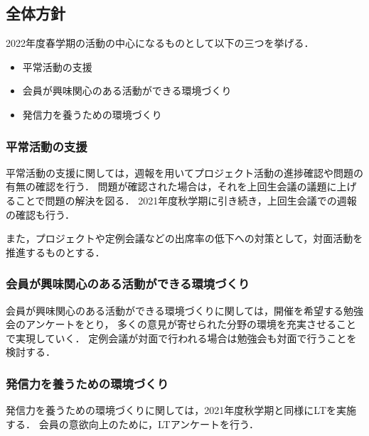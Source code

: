 \subsection*{全体方針}


2022年度春学期の活動の中心になるものとして以下の三つを挙げる．
\begin{itemize}
  \item 平常活動の支援
  \item 会員が興味関心のある活動ができる環境づくり
  \item 発信力を養うための環境づくり
\end{itemize}

\subsubsection*{平常活動の支援}
平常活動の支援に関しては，週報を用いてプロジェクト活動の進捗確認や問題の有無の確認を行う．
問題が確認された場合は，それを上回生会議の議題に上げることで問題の解決を図る．
2021年度秋学期に引き続き，上回生会議での週報の確認も行う．

また，プロジェクトや定例会議などの出席率の低下への対策として，対面活動を推進するものとする．

\subsubsection*{会員が興味関心のある活動ができる環境づくり}
会員が興味関心のある活動ができる環境づくりに関しては，開催を希望する勉強会のアンケートをとり，
多くの意見が寄せられた分野の環境を充実させることで実現していく．
定例会議が対面で行われる場合は勉強会も対面で行うことを検討する．

\subsubsection*{発信力を養うための環境づくり}
発信力を養うための環境づくりに関しては，2021年度秋学期と同様にLTを実施する．
会員の意欲向上のために，LTアンケートを行う．
